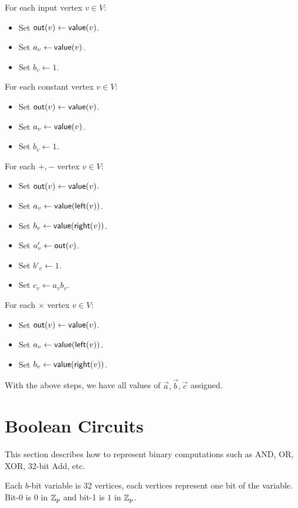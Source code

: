 For each input vertex $v \in V$:
\begin{itemize}
    \item Set $\mathsf{out}(v) \gets \mathsf{value}(v)$.
    \item Set $a_v \gets \mathsf{value}(v)$.
    \item Set $b_v \gets 1$.
\end{itemize}

For each constant vertex $v \in V$:
\begin{itemize}
    \item Set $\mathsf{out}(v) \gets \mathsf{value}(v)$.
    \item Set $a_v \gets \mathsf{value}(v)$.
    \item Set $b_v \gets 1$.
\end{itemize}

For each $+, -$ vertex $v \in V$:
\begin{itemize}
    \item Set $\mathsf{out}(v) \gets \mathsf{value}(v)$.
    \item Set $a_v \gets \mathsf{value}(\mathsf{left}(v))$.
    \item Set $b_v \gets \mathsf{value}(\mathsf{right}(v))$.
    \item Set $a'_v \gets \mathsf{out}(v)$.
    \item Set $b'_v \gets 1$.
    \item Set $c_v \gets a_v b_v$.
\end{itemize}

For each $\times$ vertex $v \in V$:
\begin{itemize}
    \item Set $\mathsf{out}(v) \gets \mathsf{value}(v)$.
    \item Set $a_v \gets \mathsf{value}(\mathsf{left}(v))$.
    \item Set $b_v \gets \mathsf{value}(\mathsf{right}(v))$.
\end{itemize}

With the above steps, we have all values of $\Vec{a}, \Vec{b}, \Vec{c}$ assigned.

\section{Boolean Circuits}

This section describes how to represent binary computations such as AND, OR, XOR, 32-bit Add, etc.

Each $b$-bit variable is 32 vertices, each vertices represent one bit of the variable. Bit-0 is $0$ in $\mathbb{Z}_p$ and bit-1 is $1$ in $\mathbb{Z}_p$.


